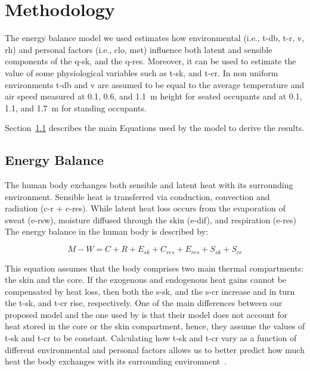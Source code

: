 
\section{Methodology}\label{sec:methodology}

The energy balance model we used estimates how environmental (i.e., \ac{t-db}, \ac{t-r}, \ac{v}, \ac{rh}) and personal factors (i.e., \ac{clo}, \ac{met}) influence both latent and sensible components of the \ac{q-sk}, and the \ac{q-res}.
Moreover, it can be used to estimate the value of some physiological variables such as \ac{t-sk}, and \ac{t-cr}.
In non uniform environments \ac{t-db} and \ac{v} are assumed to be equal to the average temperature and air speed measured at 0.1, 0.6, and 1.1~m height for seated occupants and at 0.1, 1.1, and 1.7~m for standing occupants.

Section~\ref{subsec:energy-balance} describes the main Equations used by the model to derive the results.

\subsection{Energy Balance}\label{subsec:energy-balance}

The human body exchanges both sensible and latent heat with its surrounding environment.
Sensible heat is transferred via conduction, convection and radiation (\acs{c-r} + \acs{c-res}).
While latent heat loss occurs from the evaporation of sweat (\acs{e-rsw}), moisture diffused through the skin  (\acs{e-dif}), and respiration (\acs{e-res})
The energy balance in the human body is described by:

\begin{equation}
    M - W = C + R + E_{sk} + C_{res} + E_{res} + S_{sk} + S_{cr}\label{eq:heat-balance}
\end{equation}

This equation assumes that the body comprises two main thermal compartments: the skin and the core.
If the exogenous and endogenous heat gains cannot be compensated by heat loss, then both the \ac{s-sk}, and the \ac{s-cr} increase and in turn the \ac{t-sk}, and \ac{t-cr} rise, respectively.
One of the main differences between our proposed model and the one used by  is that their model does not account for heat stored in the core or the skin compartment, hence, they assume the values of \ac{t-sk} and \ac{t-cr} to be constant.
Calculating how \ac{t-sk} and \ac{t-cr} vary as a function of different environmental and personal factors allows us to better predict how much heat the body exchanges with its surrounding environment~\cite{ASHRA2017}.

